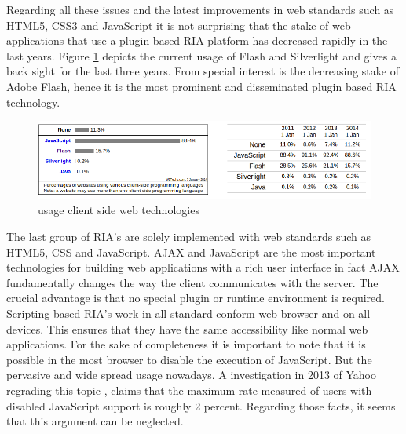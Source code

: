 Regarding all these issues and the latest improvements in web standards such as HTML5, CSS3 and JavaScript it is not surprising that the stake of web applications that use a plugin based RIA platform has decreased rapidly in the last years.
Figure \ref{fig:flash_usage} depicts the current usage of Flash and Silverlight and gives a back sight for the last three years.
From special interest is the decreasing stake of Adobe Flash, hence it is the most prominent and disseminated plugin based RIA technology.

\begin{figure}
	\centering \includegraphics[width=1.0\textwidth]{./img/web-dev/flash_usage.png}
	\caption{usage client side web technologies \autocite[]{ria_flash-usage}}
	\label{fig:flash_usage}
\end{figure}

The last group of RIA's are solely implemented with web standards such as HTML5, CSS and JavaScript.
AJAX and JavaScript are the most important technologies for building web applications with a rich user interface in fact AJAX fundamentally changes the way the client communicates with the server.
The crucial advantage is that no special plugin or runtime environment is required. 
Scripting-based RIA's work in all standard conform web browser and on all devices.
This ensures that they have the same accessibility like normal web applications. For the sake of completeness it is important to note that it is possible in the most browser to disable the execution of JavaScript. But the pervasive and wide spread usage nowadays. A investigation in 2013 of Yahoo regrading this topic \autocite{web-dev:js-disabled}, claims that the maximum rate measured of users with disabled JavaScript support is roughly 2 percent. Regarding those facts, it seems that this argument can be neglected.

